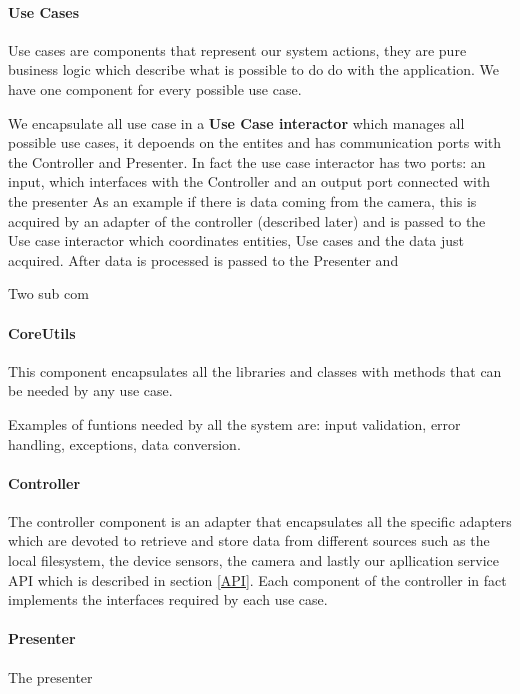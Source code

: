 \paragraph{Use Cases}
Use cases are components that represent our system actions, they are pure business logic which describe what is possible to do do with the application. We have one component for every possible use case.

We encapsulate all use case in a \textbf{Use Case interactor} which manages all possible use cases, it depoends on the entites and has communication ports with the Controller and Presenter.
In fact the use case interactor has two ports: an input, which interfaces with the Controller and an output port connected with the presenter
 As an example if there is data coming from the camera, this is acquired by an adapter of the controller (described later) and is passed to the Use case interactor which coordinates entities, Use cases and the data just acquired. After data is processed is passed to the Presenter and

Two sub com

\paragraph{CoreUtils}
This component encapsulates all the libraries and classes with methods that can be needed by any use case.

Examples of funtions needed by all the system are: input validation, error handling, exceptions, data conversion.



\paragraph{Controller}

The controller component is an adapter that encapsulates all the specific adapters which are devoted to retrieve and store data from different sources such as the local filesystem, the device sensors, the camera and lastly our apllication service API which is described in section \ref{API}.
Each component of the controller in fact implements the interfaces required by each use case.


\paragraph{Presenter}
The presenter





